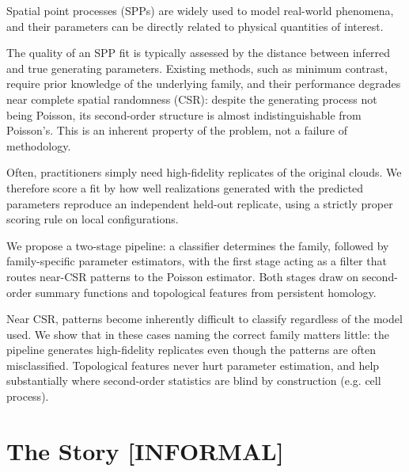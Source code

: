 \documentclass[11pt]{article}
\begin{document}
Spatial point processes (SPPs) are widely used to model real-world phenomena, and their parameters can be directly related to physical quantities of interest.

The quality of an SPP fit is typically assessed by the distance between inferred and true generating parameters. Existing methods, such as minimum contrast, require prior knowledge of the underlying family, and their performance degrades near complete spatial randomness (CSR): despite the generating process not being Poisson, its second-order structure is almost indistinguishable from Poisson's. This is an inherent property of the problem, not a failure of methodology.

Often, practitioners simply need high-fidelity replicates of the original clouds. We therefore score a fit by how well realizations generated with the predicted parameters reproduce an independent held-out replicate, using a strictly proper scoring rule on local configurations.

We propose a two-stage pipeline: a classifier determines the family, followed by family-specific parameter estimators, with the first stage acting as a filter that routes near-CSR patterns to the Poisson estimator. Both stages draw on second-order summary functions and topological features from persistent homology. 

Near CSR, patterns become inherently difficult to classify regardless of the model used. We show that in these cases naming the correct family matters little: the pipeline generates high-fidelity replicates even though the patterns are often misclassified. Topological features never hurt parameter estimation, and help substantially where second-order statistics are blind by construction (e.g. cell process).


\section*{The Story [INFORMAL]}
\end{document}
